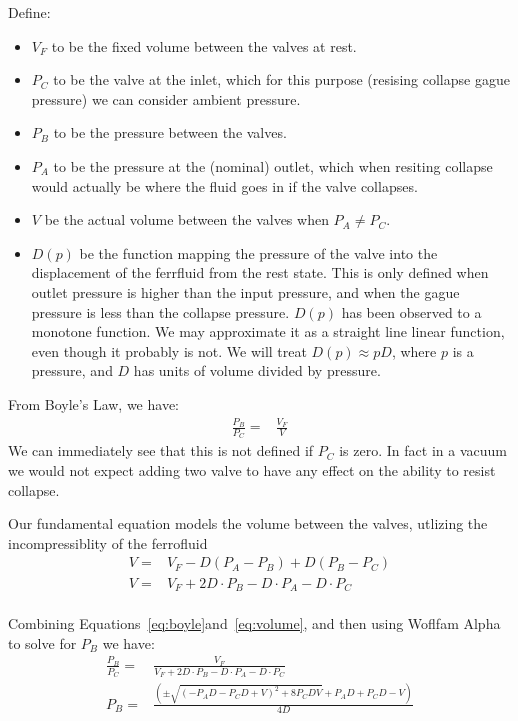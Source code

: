 \documentclass{asme2ej}
\begin{document}
Define:
\begin{itemize}
\item $V_F$ to be the fixed volume between the valves at rest.
\item $P_C$ to be the valve at the inlet, which for this purpose (resising collapse gague pressure) we can consider ambient pressure.
\item $P_B$ to be the pressure between the valves.
\item $P_A$ to be the pressure at the (nominal) outlet, which when resiting
  collapse would actually be where the fluid goes in if the valve collapses.
\item $V$ be the actual volume between the valves when $P_A \neq P_C$.
\item $D(p)$ be the function mapping the pressure of the valve into
  the displacement of the ferrfluid from the rest state. This is
  only defined when outlet pressure is higher than the input pressure, and
  when the gague pressure is less than the collapse pressure. $D(p)$ has
  been observed to a monotone function. We may approximate it as a
  straight line linear function, even though it probably is not.
  We will treat $D(p) \approx pD$, where $p$ is a pressure, and $D$ has
  units of volume divided by pressure.
\end{itemize}

From Boyle's Law, we have:
\begin{align}
  \frac{P_B}{P_C} = & \frac{V_F}{V}
  \label{eq:boyle}
  \end{align}
We can immediately see that this is not defined if $P_C$ is zero.
In fact in a vacuum we would not expect adding two valve to have any
effect on the ability to resist collapse.

Our fundamental equation models the volume between the
valves, utlizing the incompressiblity of the ferrofluid
\begin{align}
  V = & V_F - D(P_A - P_B) + D(P_B - P_C) \\
  V = & V_F + 2D\cdot P_B - D\cdot P_A - D\cdot P_C \\
    \label{eq:volume}
\end{align}

Combining Equations~\ref{eq:boyle}and~\ref{eq:volume}, and then
using Woflfam Alpha to solve for $P_B$ we have:
\begin{align}
  \frac{P_B}{P_C} = & \frac{V_F}{V_F + 2D\cdot P_B - D\cdot P_A - D\cdot P_C} \\
  P_B = & \frac{ (\pm \sqrt{(-P_A D - P_C D + V)^2 + 8 P_C D V} + P_A D + P_C D - V)}{4 D}
\end{align}
\end{document}

